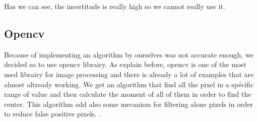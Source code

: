 Has we can see, the incertitude is really high so we cannot really use it.

\subsection{Opencv}

Because of implementing an algorithm by ourselves was not accurate enough, we decided so to use opencv librairy. As explain before, opencv is one of the most used librairy for image processing and there is already a lot of examples that are almost altready working. We get an algorithm that find all the pixel in a spécific range of value and then calculate the moment of all of them in order to find the center. This algorithm add also some mecanism for filtering alone pixels in order to reduce false positive pixels.
.

